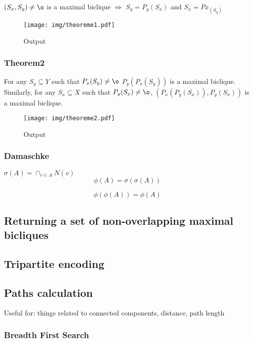 \documentclass[table]{report}
\begin{document}
$(S_x,S_y) \neq \o$ is a maximal biclique $\Leftrightarrow$ $S_y = P_y(S_x)$ and $S_x = Px_(S_y)$


\begin{figure}[h]%
\centering
\texttt{[image: img/theoreme1.pdf]}
\caption{Output}
\label{fig:theoreme1}
\end{figure}
\FloatBarrier


\subsubsection{Theorem2}  

For any $S_y \subseteq Y$ such that $P_x(S_y) \neq \o$ $P_y(P_x(S_y))$ is a maximal biclique. Similarly, for any $S_x \subseteq X$ such that $P_y(S_x) \neq \o$, $(P_x(P_y(S_x)), P_y(S_x))$ is a maximal biclique. 

\begin{figure}[h]%
\centering
\texttt{[image: img/theoreme2.pdf]}
\caption{Output}
\label{fig:theoreme2}
\end{figure}
\FloatBarrier


\subsubsection{Damaschke}

$\sigma(A) = \cap_{v\in A} N(v)$
$$\phi(A) = \sigma(\sigma(A))$$

$$\phi(\phi(A)) = \phi(A)$$

\subsection{Returning a set of non-overlapping maximal bicliques}



\subsection{Tripartite encoding}

\subsection{Paths calculation}

Useful for: things related to connected components, distance, path length

\subsubsection{Breadth First Search}
\end{document}
